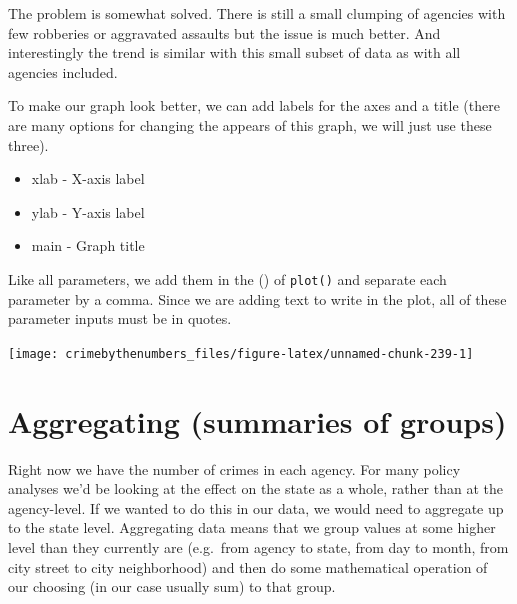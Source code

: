 \documentclass[
]{krantz}
\makeatletter
\newenvironment{Shaded}{\begin{snugshade}}{\end{snugshade}}
\newcommand{\AttributeTok}[1]{\textcolor[rgb]{0.61,0.61,0.61}{#1}}
\newcommand{\FunctionTok}[1]{\textcolor[rgb]{0,0,0}{#1}}
\newcommand{\NormalTok}[1]{#1}
\newcommand{\SpecialCharTok}[1]{\textcolor[rgb]{0,0,0}{#1}}
\newcommand{\StringTok}[1]{\textcolor[rgb]{0.5,0.5,0.5}{#1}}
\providecommand{\tightlist}{%
  \setlength{\itemsep}{0pt}\setlength{\parskip}{0pt}}
\newenvironment{kframe}{%
\medskip{}
\setlength{\fboxsep}{.8em}
 \def\at@end@of@kframe{}%
 \ifinner\ifhmode%
  \def\at@end@of@kframe{\end{minipage}}%
  \begin{minipage}{\columnwidth}%
 \fi\fi%
 \def\FrameCommand##1{\hskip\@totalleftmargin \hskip-\fboxsep
 \colorbox{shadecolor}{##1}\hskip-\fboxsep
     \hskip-\linewidth \hskip-\@totalleftmargin \hskip\columnwidth}%
 \MakeFramed {\advance\hsize-\width
   \@totalleftmargin\z@ \linewidth\hsize
   \@setminipage}}%
 {\par\unskip\endMakeFramed%
 \at@end@of@kframe}
\renewenvironment{Shaded}{\begin{kframe}}{\end{kframe}}
\makeatother
\begin{document}
The problem is somewhat solved. There is still a small clumping of agencies with few robberies or aggravated assaults but the issue is much better. And interestingly the trend is similar with this small subset of data as with all agencies included.

To make our graph look better, we can add labels for the axes and a title (there are many options for changing the appears of this graph, we will just use these three).

\begin{itemize}
\tightlist
\item
  xlab - X-axis label
\item
  ylab - Y-axis label
\item
  main - Graph title
\end{itemize}

Like all parameters, we add them in the () of \texttt{plot()} and separate each parameter by a comma. Since we are adding text to write in the plot, all of these parameter inputs must be in quotes.

\begin{Shaded}
\end{Shaded}

\begin{center}\texttt{[image: crimebythenumbers\_files/figure-latex/unnamed-chunk-239-1]} \end{center}

\hypertarget{aggregate}{%
\section{Aggregating (summaries of groups)}\label{aggregate}}

Right now we have the number of crimes in each agency. For many policy analyses we'd be looking at the effect on the state as a whole, rather than at the agency-level. If we wanted to do this in our data, we would need to aggregate up to the state level. Aggregating data means that we group values at some higher level than they currently are (e.g.~from agency to state, from day to month, from city street to city neighborhood) and then do some mathematical operation of our choosing (in our case usually sum) to that group.
\end{document}
